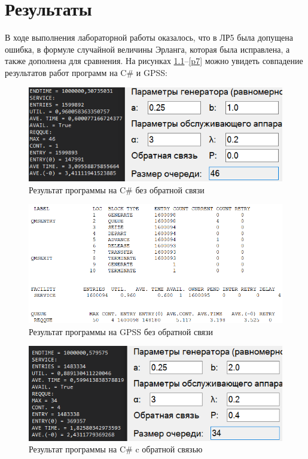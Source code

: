 \chapter{Результаты}
В ходе выполнения лабораторной работы оказалось, что в ЛР5 была допущена ошибка, в формуле случайной величины Эрланга, которая была исправлена, а также дополнена для сравнения. На рисунках \ref{p2}--\ref{p7} можно увидеть совпадение результатов работ программ на C$\#$ и GPSS:

\begin{figure}[!h]
	\includegraphics[width=1\linewidth]{inc/img/2.png}
	\caption{Результат программы на C$\#$ без обратной связи}
	\label{p2}
\end{figure}

\begin{figure}[!h]
	\includegraphics[width=1\linewidth]{inc/img/3.png}
	\caption {Результат программы на GPSS без обратной связи}
	\label{p3}
\end{figure}

\newpage
\begin{figure}[!h]
	\includegraphics[width=1\linewidth]{inc/img/4.png}
	\caption{Результат программы на C$\#$ c обратной связью}
	\label{p4}
\end{figure}

